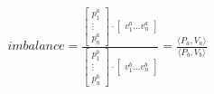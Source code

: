 \begin{align}\label{eq:imbalance}
    imbalance = 
    \frac{
    \begin{bmatrix}
        p^a_1 \\
        \vdots \\
        p^a_n
    \end{bmatrix}
    \cdot
    \begin{bmatrix}
        v^a_1 \dots v^a_n
    \end{bmatrix}
    }{
    \begin{bmatrix}
        p^b_1 \\
        \vdots \\
        p^b_n
    \end{bmatrix}
    \cdot
    \begin{bmatrix}
        v^b_1 \dots v^b_n
    \end{bmatrix}
    }
    = \frac{\langle P_a, V_a \rangle}{\langle P_b, V_b \rangle}
\end{align}